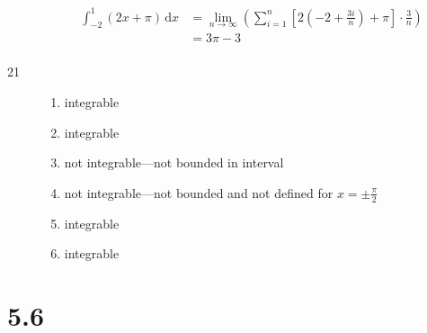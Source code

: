 \documentclass{exam}
\begin{document}
\begin{description}
\begin{align*}
  \int_{-2}^1 (2x + \pi) \, \mathrm{d}x &= \lim_{n \to \infty} \left( \sum_{i = 1}^n \left[ 2 \left( -2 + \frac{3i}{n} \right) + \pi \right] \cdot \frac{3}{n} \right) \\
  &= 3 \pi - 3 \\
\end{align*}

\item[21]
\begin{enumerate}[a]

\item integrable

\item integrable

\item not integrable---not bounded in interval

\item not integrable---not bounded and not defined for $x = \pm \frac{\pi}{2}$

\item integrable

\item integrable

\end{enumerate}

\end{description}

\pagebreak

\section{5.6}
\end{document}
